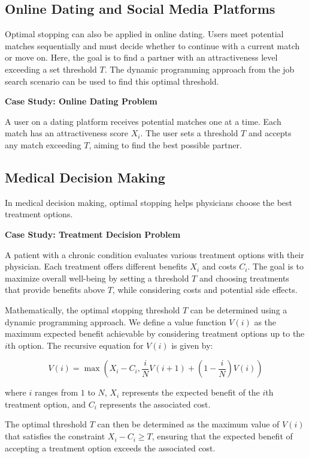 \documentclass[12pt]{book} %
\begin{document}
\subsection{Online Dating and Social Media Platforms}

Optimal stopping can also be applied in online dating. Users meet potential matches sequentially and must decide whether to continue with a current match or move on. Here, the goal is to find a partner with an attractiveness level exceeding a set threshold \(T\). The dynamic programming approach from the job search scenario can be used to find this optimal threshold.

\textbf{Case Study: Online Dating Problem}

A user on a dating platform receives potential matches one at a time. Each match has an attractiveness score \(X_i\). The user sets a threshold \(T\) and accepts any match exceeding \(T\), aiming to find the best possible partner.

\subsection{Medical Decision Making}

In medical decision making, optimal stopping helps physicians choose the best treatment options. 

\textbf{Case Study: Treatment Decision Problem}

A patient with a chronic condition evaluates various treatment options with their physician. Each treatment offers different benefits \(X_i\) and costs \(C_i\). The goal is to maximize overall well-being by setting a threshold \(T\) and choosing treatments that provide benefits above \(T\), while considering costs and potential side effects.

Mathematically, the optimal stopping threshold \(T\) can be determined using a dynamic programming approach. We define a value function \(V(i)\) as the maximum expected benefit achievable by considering treatment options up to the \(i\)th option. The recursive equation for \(V(i)\) is given by:

\[
V(i) = \max\left(X_i - C_i, \frac{i}{N}V(i+1) + \left(1 - \frac{i}{N}\right)V(i)\right)
\]

where \(i\) ranges from \(1\) to \(N\), \(X_i\) represents the expected benefit of the \(i\)th treatment option, and \(C_i\) represents the associated cost.

The optimal threshold \(T\) can then be determined as the maximum value of \(V(i)\) that satisfies the constraint \(X_i - C_i \geq T\), ensuring that the expected benefit of accepting a treatment option exceeds the associated cost.
\end{document}
